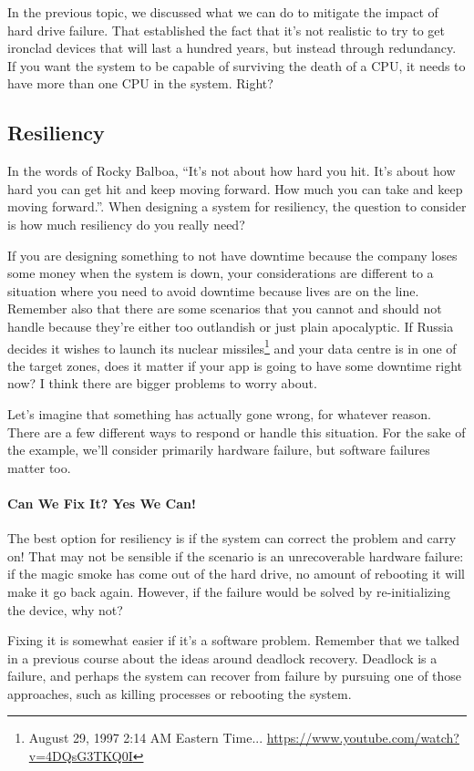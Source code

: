 In the previous topic, we discussed what we can do to mitigate the impact of hard drive failure. That established the fact that it's not realistic to try to get ironclad devices that will last a hundred years, but instead through redundancy. If you want the system to be capable of surviving the death of a CPU, it needs to have more than one CPU in the system. Right?

\subsection*{Resiliency}
In the words of Rocky Balboa, ``It's not about how hard you hit. It's about how hard you can get hit and keep moving forward. How much you can take and keep moving forward.''. When designing a system for resiliency, the question to consider is how much resiliency do you really need? 

If you are designing something to not have downtime because the company loses some money when the system is down, your considerations are different to a situation where you need to avoid downtime because lives are on the line. Remember also that there are some scenarios that you cannot and should not handle because they're either too outlandish or just plain apocalyptic. If Russia decides it wishes to launch its nuclear missiles\footnote{ August 29, 1997 2:14 AM Eastern Time... \url{https://www.youtube.com/watch?v=4DQsG3TKQ0I}} and your data centre is in one of the target zones, does it matter if your app is going to have some downtime right now? I think there are bigger problems to worry about.

Let's imagine that something has actually gone wrong, for whatever reason. There are a few different ways to respond or handle this situation. For the sake of the example, we'll consider primarily hardware failure, but software failures matter too.

\paragraph{Can We Fix It? Yes We Can!} The best option for resiliency is if the system can correct the problem and carry on! That may not be sensible if the scenario is an unrecoverable hardware failure: if the magic smoke has come out of the hard drive, no amount of rebooting it will make it go back again. However, if the failure would be solved by re-initializing the device, why not?

Fixing it is somewhat easier if it's a software problem. Remember that we talked in a previous course about the ideas around deadlock recovery. Deadlock is a failure, and perhaps the system can recover from failure by pursuing one of those approaches, such as killing processes or rebooting the system.

